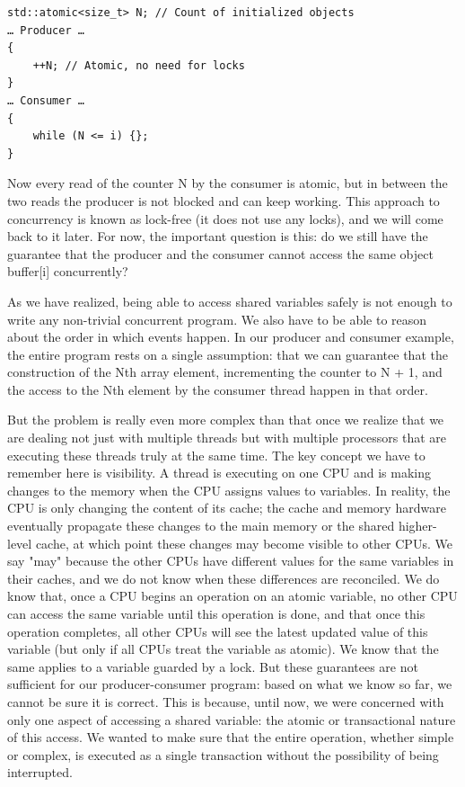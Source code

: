 \begin{lstlisting}[style=styleCXX]
std::atomic<size_t> N; // Count of initialized objects
… Producer …
{
	++N; // Atomic, no need for locks
}
… Consumer …
{
	while (N <= i) {};
}
\end{lstlisting}

Now every read of the counter N by the consumer is atomic, but in between the two reads the producer is not blocked and can keep working. This approach to concurrency is known as lock-free (it does not use any locks), and we will come back to it later. For now, the important question is this: do we still have the guarantee that the producer and the consumer cannot access the same object buffer[i] concurrently?


As we have realized, being able to access shared variables safely is not enough to write any non-trivial concurrent program. We also have to be able to reason about the order in which events happen. In our producer and consumer example, the entire program rests on a single assumption: that we can guarantee that the construction of the Nth array element, incrementing the counter to N + 1, and the access to the Nth element by the consumer thread happen in that order.

But the problem is really even more complex than that once we realize that we are dealing not just with multiple threads but with multiple processors that are executing these threads truly at the same time. The key concept we have to remember here is visibility. A thread is executing on one CPU and is making changes to the memory when the CPU assigns values to variables. In reality, the CPU is only changing the content of its cache; the cache and memory hardware eventually propagate these changes to the main memory or the shared higher-level cache, at which point these changes may become visible to other CPUs. We say "may" because the other CPUs have different values for the same variables in their caches, and we do not know when these differences are reconciled. We do know that, once a CPU begins an operation on an atomic variable, no other CPU can access the same variable until this operation is done, and that once this operation completes, all other CPUs will see the latest updated value of this variable (but only if all CPUs treat the variable as atomic). We know that the same applies to a variable guarded by a lock. But these guarantees are not sufficient for our producer-consumer program: based on what we know so far, we cannot be sure it is correct. This is because, until now, we were concerned with only one aspect of accessing a shared variable: the atomic or transactional nature of this access. We wanted to make sure that the entire operation, whether simple or complex, is executed as a single transaction without the possibility of being interrupted.

